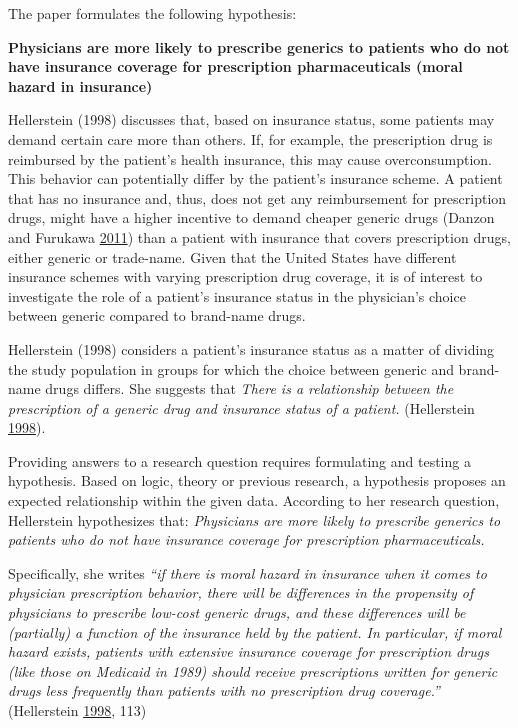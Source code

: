 \documentclass[
]{book}
\begin{document}
The paper formulates the following hypothesis:

\textbf{Physicians are more likely to prescribe generics to patients who
do not have insurance coverage for prescription pharmaceuticals (moral
hazard in insurance)}

Hellerstein (1998) discusses that, based on insurance status, some
patients may demand certain care more than others. If, for example, the
prescription drug is reimbursed by the patient's health insurance, this
may cause overconsumption. This behavior can potentially differ by the
patient's insurance scheme. A patient that has no insurance and, thus,
does not get any reimbursement for prescription drugs, might have a
higher incentive to demand cheaper generic drugs (Danzon and Furukawa
\protect\hyperlink{ref-danzon_cross-national_2011}{2011}) than a patient
with insurance that covers prescription drugs, either generic or
trade-name. Given that the United States have different insurance
schemes with varying prescription drug coverage, it is of interest to
investigate the role of a patient's insurance status in the physician's
choice between generic compared to brand-name drugs.

Hellerstein (1998) considers a patient's insurance status as a matter of
dividing the study population in groups for which the choice between
generic and brand-name drugs differs. She suggests that \emph{There is a
relationship between the prescription of a generic drug and insurance
status of a patient.} (Hellerstein
\protect\hyperlink{ref-hellerstein_importance_1998}{1998}).

Providing answers to a research question requires formulating and
testing a hypothesis. Based on logic, theory or previous research, a
hypothesis proposes an expected relationship within the given data.
According to her research question, Hellerstein hypothesizes that:
\emph{Physicians are more likely to prescribe generics to patients who
do not have insurance coverage for prescription pharmaceuticals.}

Specifically, she writes \emph{``if there is moral hazard in insurance
when it comes to physician prescription behavior, there will be
differences in the propensity of physicians to prescribe low-cost
generic drugs, and these differences will be (partially) a function of
the insurance held by the patient. In particular, if moral hazard
exists, patients with extensive insurance coverage for prescription
drugs (like those on Medicaid in 1989) should receive prescriptions
written for generic drugs less frequently than patients with no
prescription drug coverage.''} (Hellerstein
\protect\hyperlink{ref-hellerstein_importance_1998}{1998}, 113)
\end{document}
